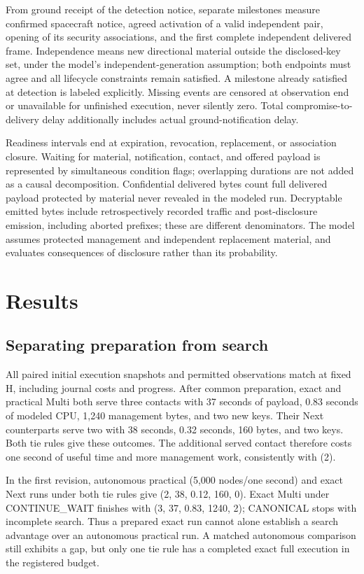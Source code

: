 \documentclass[12pt,a4paper]{article}
\begin{document}
From ground receipt of the detection notice, separate milestones measure confirmed spacecraft notice, agreed activation of a valid independent pair, opening of its security associations, and the first complete independent delivered frame. Independence means new directional material outside the disclosed-key set, under the model's independent-generation assumption; both endpoints must agree and all lifecycle constraints remain satisfied. A milestone already satisfied at detection is labeled explicitly. Missing events are censored at observation end or unavailable for unfinished execution, never silently zero. Total compromise-to-delivery delay additionally includes actual ground-notification delay.

Readiness intervals end at expiration, revocation, replacement, or association closure. Waiting for material, notification, contact, and offered payload is represented by simultaneous condition flags; overlapping durations are not added as a causal decomposition. Confidential delivered bytes count full delivered payload protected by material never revealed in the modeled run. Decryptable emitted bytes include retrospectively recorded traffic and post-disclosure emission, including aborted prefixes; these are different denominators. The model assumes protected management and independent replacement material, and evaluates consequences of disclosure rather than its probability.

\section*{Results}
\subsection*{Separating preparation from search}
All paired initial execution snapshots and permitted observations match at fixed H, including journal costs and progress. After common preparation, exact and practical Multi both serve three contacts with 37 seconds of payload, 0.83 seconds of modeled CPU, 1,240 management bytes, and two new keys. Their Next counterparts serve two with 38 seconds, 0.32 seconds, 160 bytes, and two keys. Both tie rules give these outcomes. The additional served contact therefore costs one second of useful time and more management work, consistently with (2).

In the first revision, autonomous practical (5,000 nodes/one second) and exact Next runs under both tie rules give (2, 38, 0.12, 160, 0). Exact Multi under CONTINUE\_WAIT finishes with (3, 37, 0.83, 1240, 2); CANONICAL stops with incomplete search. Thus a prepared exact run cannot alone establish a search advantage over an autonomous practical run. A matched autonomous comparison still exhibits a gap, but only one tie rule has a completed exact full execution in the registered budget.
\end{document}
